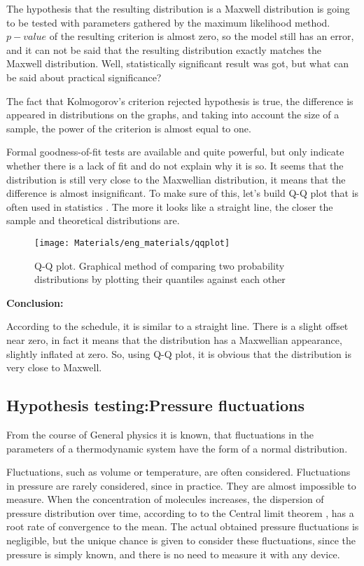 \documentclass[12pt,twoside]{article}
\begin{document}
    The hypothesis that the resulting distribution is a Maxwell distribution is going to be tested with parameters gathered by the maximum likelihood method.
    $p-value$ of the resulting criterion is almost zero, so the model still has an error, and it can not be said that the resulting distribution exactly matches the Maxwell distribution.
    Well, statistically significant result was got, but what can be said about practical significance?


    \indent The fact that Kolmogorov's criterion rejected hypothesis is true, the difference is appeared in distributions on the graphs, and taking into account the size of a sample,
    the power of the criterion is almost equal to one.

    Formal goodness-of-fit tests are available and quite powerful, but only indicate whether there is a lack of fit and do not explain why it is so.
    It seems that the distribution is still very close to the Maxwellian distribution, it means that the difference is almost insignificant.
    To make sure of this, let's build Q-Q plot that is often used in statistics \cite{aldor2013power}.
    The more it looks like a straight line, the closer the sample and theoretical distributions are.

    \begin{figure}[H]
        \centering
        {\texttt{[image: Materials/eng\_materials/qqplot]}}
        \caption{Q-Q plot. Graphical method of comparing two probability distributions by plotting their quantiles against each other %
        }
    \end{figure}

    \textbf{Conclusion:}

    According to the schedule, it is similar to a straight line.
    There is a slight offset near zero, in fact it means that the distribution has a Maxwellian appearance, slightly inflated at zero.
    So, using Q-Q plot, it is obvious that the distribution is very close to Maxwell.

    \subsection{Hypothesis testing:Pressure fluctuations}

    From the course of General physics it is known, that fluctuations in the parameters of a thermodynamic system have the form of a normal distribution. \cite{sivuhin}

    Fluctuations, such as volume or temperature, are often considered. Fluctuations in pressure are rarely considered, since in practice.
    They are almost impossible to measure. When the concentration of molecules increases, the dispersion of pressure distribution over time, according to
    to the Central limit theorem \cite{rosenblatt1956central}, has a root rate of convergence to the mean.
    The actual obtained pressure fluctuations is negligible, but the unique chance is given to consider these fluctuations, since the pressure is simply known, and there is no need to measure it with any device.
\end{document}
